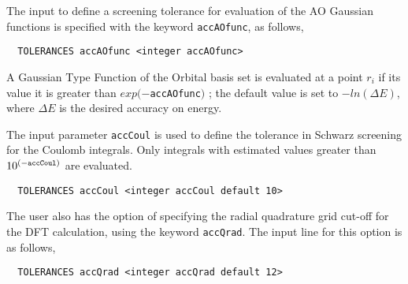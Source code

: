 The input to define a screening tolerance for evaluation of the AO 
Gaussian functions is specified with the keyword \verb+accAOfunc+, as
follows,
\begin{verbatim}
  TOLERANCES accAOfunc <integer accAOfunc>
\end{verbatim}
A Gaussian Type Function of the Orbital basis set is 
evaluated at a point $r_i$ if its value it is greater than 
$exp(-${\tt accAOfunc}$)$ ;
the default value is set to $-ln(\Delta E)$, where $\Delta E$ is the desired 
accuracy on energy.

%

The input
parameter {\tt accCoul} is used to define the tolerance in Schwarz 
screening for the Coulomb integrals.  Only integrals with estimated
values greater than $10^{(-{\tt accCoul})}$ are evaluated.

\begin{verbatim}
  TOLERANCES accCoul <integer accCoul default 10>
\end{verbatim}

The user also has the option of specifying the radial quadrature 
grid cut-off for the DFT calculation, using the keyword
\verb+accQrad+.  The input line for this option is as follows,
\begin{verbatim}
  TOLERANCES accQrad <integer accQrad default 12>
\end{verbatim}


